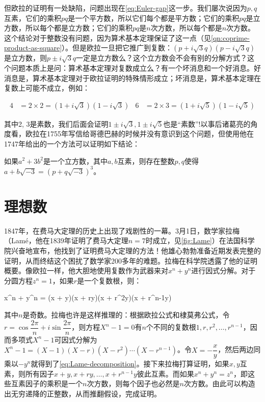 \documentclass[b5paper]{ctexart}
\begin{document}
但欧拉的证明有一处缺陷，问题出现在\cref{eq:Euler-gap}这一步。我们屡次说因为$p, q$互素，它们的乘积$pq$是一个平方数，所以它们每个都是平方数；它们的乘积$pq$是立方数，所以每个都是立方数；它们的乘积$pq$是$n$次方数，所以每个都是$n$次方数。这个结论对于整数没有问题，因为算术基本定理保证了这一点（见\cref{qn:coprime-product-as-square}）。但是欧拉一旦把它推广到复数：$(p + i\sqrt{3}q)(p - i\sqrt{3}q)$是立方数，则$p \pm i\sqrt{3}q$一定是立方数么？这个立方数会不会有别的分解方式？这个问题本质上是问：算术基本定理对复数成立么？有一个坏消息和一个好消息。好消息是，算术基本定理对于欧拉证明的特殊情形成立；坏消息是，算术基本定理在复数上可能不成立，例如：

\begin{align*}
4 &= 2 \times 2 = (1 + i\sqrt{3})(1 - i\sqrt{3}) & 6 &= 2 \times 3 = (1 + i\sqrt{5})(1 - i\sqrt{5})
\end{align*}




其中2, 3是素数，我们后面会证明$1 \pm i\sqrt{3}, 1 \pm i\sqrt{5}$也是“素数”!以事后诸葛亮的角度看，欧拉在1755年写信给哥德巴赫的时候并没有意识到这个问题，但使用他在1747年给出的一个方法可以证明如下结论：

\begin{lemma}[欧拉]
如果$a^2 + 3b^2$是一个立方数，其中$a, b$互素，则存在整数$p, q$使得$a + b\sqrt{-3} = (p + q\sqrt{-3})^3$。
\end{lemma}

\section{理想数}

1847年，在费马大定理的历史上出现了戏剧性的一幕。3月1日，数学家拉梅（Lamé，他在1839年证明了费马大定理$n = 7$时成立，见\cref{fig:Lame}）在法国科学院兴奋地宣布，他找到了证明费马大定理的方法！他雄心勃勃准备近期发表完整的证明，从而终结这个困扰了数学家200多年的难题。拉梅在科学院透露了他的证明概要。像欧拉一样，他大胆地使用复数作为武器来对$x^n + y^n$进行因式分解。对于分圆方程$z^n = 1$，如果$r$是一个复数根，则：

\be \label{eq:Lame-decomposition}
x^n + y^n = (x + y)(x + ry)(x + r^2y)\dotsm(x + r^{n-1}y)
\ee

其中$n$是奇数。拉梅也许是这样推理的：根据欧拉公式和棣莫弗公式，令$r = \cos \dfrac{2\pi}{n} + i\sin \dfrac{2\pi}{n}$，则方程$X^n - 1 = 0$有$n$个不同的复数根$1, r, r^2, \dotsc, r^{n-1}$，因而多项式$X^n - 1$可因式分解为$X^n - 1 = (X - 1)(X - r)(X - r^2)\dotsm(X - r^{n-1})$。令$X = -\dfrac{x}{y}$，然后两边同乘以$-y^n$就得到了\cref{eq:Lame-decomposition}。接下来拉梅打算证明，如果$x, y$互素，则所有因子$x + y, x + ry, \dotsc, x + r^{n-1}y$彼此互素。而如果$x^n + y^n = z^n$，即这些互素因子的乘积是一个$n$次方数，则每个因子也必然是$n$次方数。由此可以构造出无穷递降的正整数，从而推翻假设，完成证明。
\end{document}
